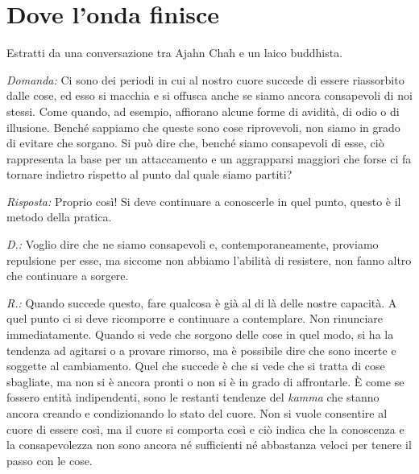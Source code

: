 \chapter{Dove l'onda finisce}

\begin{openingQuote}
  Estratti da una conversazione tra Ajahn Chah e un laico buddhista.
\end{openingQuote}

\emph{Domanda:} Ci sono dei periodi in cui al nostro cuore succede di essere
riassorbito dalle cose, ed esso si macchia e si offusca anche se siamo
ancora consapevoli di noi stessi. Come quando, ad esempio, affiorano
alcune forme di avidità, di odio o di illusione. Benché sappiamo che
queste sono cose riprovevoli, non siamo in grado di evitare che sorgano.
Si può dire che, benché siamo consapevoli di esse, ciò rappresenta la
base per un attaccamento e un aggrapparsi maggiori che forse ci fa
tornare indietro rispetto al punto dal quale siamo partiti?

\emph{Risposta:} Proprio così! Si deve continuare a conoscerle in quel punto,
questo è il metodo della pratica.

\emph{D.:} Voglio dire che ne siamo consapevoli e, contemporaneamente, proviamo
repulsione per esse, ma siccome non abbiamo l'abilità di resistere, non
fanno altro che continuare a sorgere.

\emph{R.:} Quando succede questo, fare qualcosa è già al di là delle nostre
capacità. A quel punto ci si deve ricomporre e continuare a contemplare.
Non rinunciare immediatamente. Quando si vede che sorgono delle cose in
quel modo, si ha la tendenza ad agitarsi o a provare rimorso, ma è
possibile dire che sono incerte e soggette al cambiamento. Quel che
succede è che si vede che si tratta di cose sbagliate, ma non si è
ancora pronti o non si è in grado di affrontarle. È come se fossero
entità indipendenti, sono le restanti tendenze del \emph{kamma} che
stanno ancora creando e condizionando lo stato del cuore. Non si vuole
consentire al cuore di essere così, ma il cuore si comporta così e ciò
indica che la conoscenza e la consapevolezza non sono ancora né
sufficienti né abbastanza veloci per tenere il passo con le cose.

